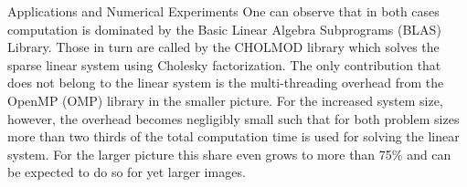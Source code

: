 \begin{chapter}{Applications and Numerical Experiments}
One can observe that in both cases computation is dominated by the Basic Linear Algebra Subprograms (BLAS) Library. Those in turn are called by the CHOLMOD library which solves the sparse
linear system using Cholesky factorization. The only contribution that does not belong to the linear system is the multi-threading overhead from the OpenMP (OMP) library in the smaller picture.
For the increased system size, however, the overhead becomes negligibly small such that for both problem sizes more than two thirds of the total computation time is used for solving the linear
system. For the larger picture this share even grows to more than 75\% and can be expected to do so for yet larger images.\\
\begin{figure}[h!]
    \centering
\end{figure}
\begin{table}[h!]
\centering
\footnotesize
\setlength{\tabcolsep}{3pt}
\end{table}
\end{chapter}
